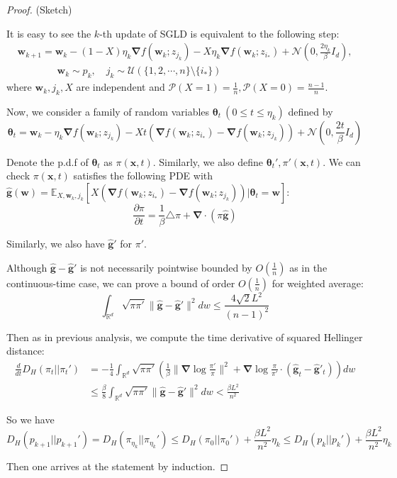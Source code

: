 \documentclass[final,12pt]{colt2018} %
\newcommand{\x}{\bm{x}}
\begin{document}
\begin{proof}(Sketch)

It is easy to see the $k$-th update of SGLD is equivalent to the following step:
\begin{align*}
\bm{w}_{k+1}=\bm{w}_k-(1-X)\eta_k\bm{\nabla} f(\bm{w}_k;z_{j_k})-X \eta_k \bm{\nabla}f(\bm{w}_k;z_{i_*})+\mathcal{N}(0,\frac{2\eta_k}{\beta}I_d),\\
\quad\quad\quad\quad \bm{w}_k\sim p_k, \quad j_k\sim\mathcal{U}(\{1,2,\cdots,n\}\setminus \{i_*\})
\end{align*}
where $\bm{w}_k,j_k,X$ are independent and $\mathcal{P}(X=1)=\frac{1}{n}, \mathcal{P}(X=0)=\frac{n-1}{n}$.

Now, we consider a family of random variables $\bm{\theta}_t~(0\le t\le \eta_k)$ defined by
\begin{equation}
  \bm{\theta}_t=\bm{w}_k-\eta_k\bm{\nabla} f(\bm{w}_k;z_{j_k})-X t (\bm{\nabla}f(\bm{w}_k;z_{i_*})-\bm{\nabla} f(\bm{w}_k;z_{j_k}))+\mathcal{N}(0,\frac{2t}{\beta}I_d)
\end{equation}

Denote the p.d.f of $\bm{\theta}_t$ as $\pi(\x, t)$. Similarly, we also define $\bm{\theta}_t', \pi'(\x,t)$. We can check $\pi(\x, t)$ satisfies the following PDE with $\hat{\bm{g}}(\bm{w})=\mathbb{E}_{X,\bm{w}_k,j_k}[X(\bm{\nabla}f(\bm{w}_k;z_{i_*})-\bm{\nabla} f(\bm{w}_k;z_{j_k}))|\bm{\theta}_{t}=\bm{w}]$:
\begin{equation}
  \frac{\partial \pi}{\partial t}= \frac{1}{ \beta}\triangle \pi+\bm{\nabla}\cdot(\pi \hat{\bm{g}})
\end{equation}

Similarly, we also have $\hat{\bm{g}}'$ for $\pi'$.

Although $\hat{\bm{g}}-\hat{\bm{g}}'$ is not necessarily pointwise bounded by $O(\frac{1}{n})$ as in the continuous-time case, we can prove a bound of order $O(\frac{1}{n})$ for weighted average:
\begin{equation}
  \int_{\mathbb{R}^d} \sqrt{\pi \pi'}\|\hat{\bm{g}}-\hat{\bm{g}}'\|^2dw\le \frac{4\sqrt{2}L^2}{(n-1)^2}
\end{equation}

Then as in previous analysis, we compute the time derivative of squared Hellinger distance:
\begin{align*}
\frac{d}{dt}D_H(\pi_t||\pi_t')&=-\frac{1}{4}\int_{\mathbb{R}^d}\sqrt{\pi \pi'}\left(\frac{1}{\beta}\|\bm{\nabla}\log\frac{\pi'}{\pi}\|^2+\bm{\nabla}\log\frac{\pi}{\pi'}\cdot(\hat{\bm{g}}_t-\hat{\bm{g}}'_t)\right)dw\\
&\le \frac{\beta}{8}\int_{\mathbb{R}^d} \sqrt{\pi \pi'}\|\hat{\bm{g}}-\hat{\bm{g}}'\|^2dw<\frac{\beta L^2}{n^2}
\end{align*}

So we have
\begin{equation}
  D_H(p_{k+1}||p_{k+1}')= D_H(\pi_{\eta_k}||\pi_{\eta_k}')\le D_H(\pi_0||\pi_0')+\frac{\beta L^2}{n^2}\eta_k\le D_H(p_k||p_k')+\frac{\beta L^2}{n^2}\eta_k
\end{equation}

Then one arrives at the statement by induction.
\end{proof}
\end{document}
